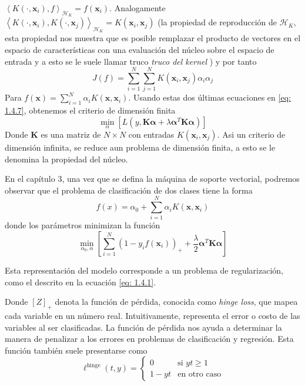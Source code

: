 \documentclass[letterpaper,12pt,oneside]{book}
\newcommand{\inprod}[2]{\left<#1, #2\right>} %
\begin{document}
{{    $\inprod{K(\cdot, \mathbf{x}_i)}{f }_{\mathcal{H}_K} = f(\mathbf{x}_i)$.  Analogamente 
    $\inprod{K(\cdot, \mathbf{x}_i)}{K(\cdot, \mathbf{x}_j)}_{\mathcal{H}_K} = K(\mathbf{x}_i, \mathbf{x}_j)$ (la propiedad de reproducción de $\mathcal{H}_K$, esta propiedad nos muestra que es posible remplazar el producto de vectores en el espacio de características con una evaluación del núcleo sobre el espacio de entrada y a esto se le suele llamar truco \textit{truco del kernel} ) y por tanto 
    \begin{equation}
        J(f) = \sum_{i=1}^N \sum_{j=1}^N K(\mathbf{x}_i, \mathbf{x}_j) \alpha_i \alpha_j
    \end{equation}
    Para $ f(\mathbf{x}) = \sum_{i=1}^N \alpha_i K(\mathbf{x}, \mathbf{x}_i)$.
    Usando estas dos últimas ecuaciones en \eqref{eq: 1.4.7}, obtenemos el criterio de dimensión finita
    \begin{equation}
        \min_\alpha \left[ L(y, \mathbf{K} \boldsymbol{\alpha} + \lambda \boldsymbol{\alpha}^T \mathbf{K} \boldsymbol{\alpha}) \right]
    \end{equation}
    Donde $\mathbf{K}$ es una matriz de $N\times N$ con entradas $K(\mathbf{x}_i,\mathbf{x}_j)$. Asi un criterio de dimensión infinita, se reduce aun problema de dimensión finita, a esto se le denomina la propiedad del núcleo.
    
En el capítulo 3, una vez que se defina la máquina de soporte vectorial, podremos observar que el problema de clasificación de dos clases tiene la forma  
    \begin{equation}
        f(x) = \alpha_0 + \sum_{i=1}^{N} \alpha_i K(\mathbf{x}, \mathbf{x}_i)
    \end{equation}
    donde los parámetros minimizan la función  
    \begin{equation}
        \min_{\alpha_0, \alpha} \left[ \sum_{i=1}^{N} \left(1 - y_i f(\mathbf{x}_i) \right)_+ + \frac{\lambda}{2} \boldsymbol{\alpha}^T \mathbf{K} \boldsymbol{\alpha} \right] \label{eq: 1.7.1}
    \end{equation}
    
    Esta representación del modelo corresponde a un problema de regularización, como el descrito en la ecuación \ref{eq: 1.4.1}.  
    
    Donde $[Z]_+$ denota la función de pérdida, conocida como \textit{hinge loss}, que mapea cada variable en un número real. Intuitivamente, representa el error o costo de las variables al ser clasificadas. La función de pérdida nos ayuda a determinar la manera de penalizar a los errores en problemas de clasificación y regresión.
    Esta función también suele presentarse como  
    \begin{equation}
        \ell^{\text{hinge}}(t, y) = 
        \begin{cases}
        0 & \text{si } yt \geq 1 \\
        1 - yt & \text{en otro caso}
        \end{cases}
    \end{equation}
    
}}
\end{document}
